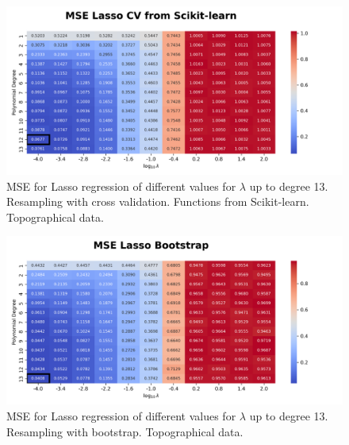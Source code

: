 \documentclass{article}
\begin{document}
\begin{figure}[htbp]
    \centering
    \includegraphics[width=\textwidth]{Project1/figures/Terrain/Heatmap_MSE_Lasso_CV_from_Scikit-learn.png}
    \caption{MSE for Lasso regression of different values for $\lambda$ up to degree 13. Resampling with cross validation. Functions from Scikit-learn. Topographical data.}
    \label{fig:TerrainLassoCVsklearn}
\end{figure}

\begin{figure}[htbp]
    \centering
    \includegraphics[width=\textwidth]{Project1/figures/Terrain/Heatmap_MSE_Lasso_Bootstrap.png}
    \caption{MSE for Lasso regression of different values for $\lambda$ up to degree 13. Resampling with bootstrap. Topographical data.}
    \label{fig:TerrainLassoBootstrap}
\end{figure}
\end{document}

